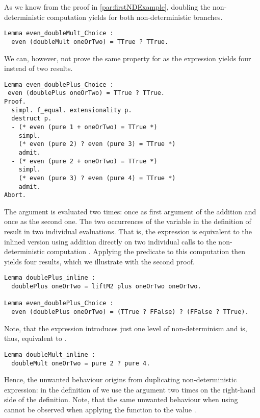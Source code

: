As we know from the proof in \autoref{par:firstNDExample}, doubling
the non-deterministic computation  yields 
for both non-deterministic branches.

\begin{verbatim}
Lemma even_doubleMult_Choice :
  even (doubleMult oneOrTwo) = TTrue ? TTrue.
\end{verbatim}

We can, however, not prove the same property for  as
the expression yields four instead of two results.

\begin{verbatim}
Lemma even_doublePlus_Choice :
 even (doublePlus oneOrTwo) = TTrue ? TTrue.
Proof.
  simpl. f_equal. extensionality p.
  destruct p.
  - (* even (pure 1 + oneOrTwo) = TTrue *)
    simpl.
    (* even (pure 2) ? even (pure 3) = TTrue *)
    admit.
  - (* even (pure 2 + oneOrTwo) = TTrue *)
    simpl.
    (* even (pure 3) ? even (pure 4) = TTrue *)
    admit.
Abort.
\end{verbatim}

The argument  is evaluated two times: once as first
argument of the addition and once as the second one.
The two occurrences of the variable  in the
definition of  result in two individual evaluations.
That is, the expression is equivalent to the inlined version using
addition directly on two individual calls to the non-deterministic
computation .
Applying the predicate  to this computation then yields
four results, which we illustrate with the second proof.

\begin{verbatim}
Lemma doublePlus_inline :
  doublePlus oneOrTwo = liftM2 plus oneOrTwo oneOrTwo.

Lemma even_doublePlus_Choice :
  even (doublePlus oneOrTwo) = (TTrue ? FFalse) ? (FFalse ? TTrue).
\end{verbatim}

Note, that the expression  introduces just
one level of non-determinism and is, thus, equivalent to .

\begin{verbatim}
Lemma doubleMult_inline :
  doubleMult oneOrTwo = pure 2 ? pure 4.
\end{verbatim}

Hence, the unwanted behaviour origins from duplicating
non-deterministic expression: in the definition of 
we use the argument  two times on the right-hand side of the
definition.
Note, that the same unwanted behaviour when using 
cannot be observed when applying the function to the value .

